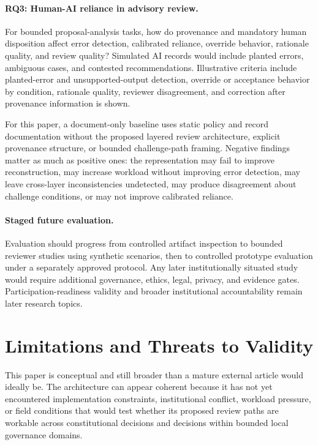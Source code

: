 \documentclass[11pt]{article}
\begin{document}
\paragraph{RQ3: Human-AI reliance in advisory review.} For bounded
proposal-analysis tasks, how do provenance and mandatory human disposition
affect error detection, calibrated reliance, override behavior, rationale
quality, and review quality? Simulated AI records would include planted errors,
ambiguous cases, and contested recommendations. Illustrative criteria include
planted-error and unsupported-output detection, override or acceptance
behavior by condition, rationale quality, reviewer disagreement, and
correction after provenance information is shown.

For this paper, a document-only baseline uses static policy and record
documentation without the proposed layered review architecture, explicit
provenance structure, or bounded challenge-path framing. Negative findings
matter as much as positive ones: the representation may fail to improve
reconstruction, may increase workload without improving error detection, may
leave cross-layer inconsistencies undetected, may produce disagreement about
challenge conditions, or may not improve calibrated reliance.

\paragraph{Staged future evaluation.} Evaluation should progress from
controlled artifact inspection to bounded reviewer studies using synthetic
scenarios, then to controlled prototype evaluation under a separately approved
protocol. Any later institutionally situated study would require additional
governance, ethics, legal, privacy, and evidence gates. Participation-readiness
validity and broader institutional accountability remain later research
topics.

\section{Limitations and Threats to Validity}

This paper is conceptual and still broader than a mature external article
would ideally be. The architecture can appear coherent because it has not yet
encountered implementation constraints, institutional conflict, workload
pressure, or field conditions that would test whether its proposed review
paths are workable across constitutional decisions and decisions within
bounded local governance domains.
\end{document}
